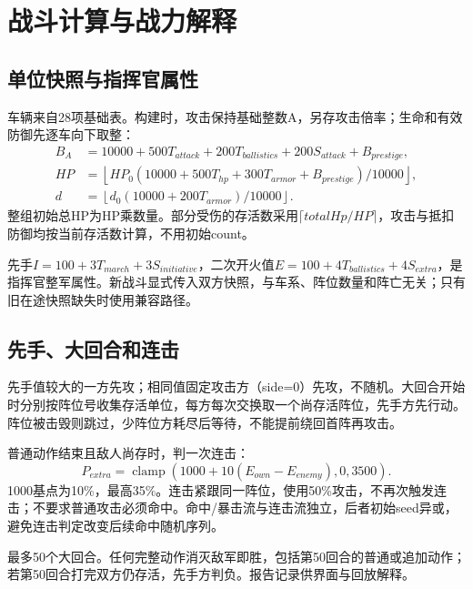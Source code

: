 \chapter{战斗计算与战力解释}
\section{单位快照与指挥官属性}
车辆来自28项基础表。构建时，攻击保持基础整数A，另存攻击倍率；生命和有效防御先逐车向下取整：
\begin{align}
B_A&=10000+500T_{attack}+200T_{ballistics}+200S_{attack}+B_{prestige},\\
HP&=\left\lfloor HP_0(10000+500T_{hp}+300T_{armor}+B_{prestige})/10000\right\rfloor,\\
d&=\left\lfloor d_0(10000+200T_{armor})/10000\right\rfloor.
\end{align}
整组初始总HP为HP乘数量。部分受伤的存活数采用\(\lceil totalHp/HP\rceil\)，攻击与抵扣防御均按当前存活数计算，不用初始count。

先手\(I=100+3T_{march}+3S_{initiative}\)，二次开火值\(E=100+4T_{ballistics}+4S_{extra}\)，是指挥官整军属性。新战斗显式传入双方快照，与车系、阵位数量和阵亡无关；只有旧在途快照缺失时使用兼容路径。

\section{先手、大回合和连击}
先手值较大的一方先攻；相同值固定攻击方（side=0）先攻，不随机。大回合开始时分别按阵位号收集存活单位，每方每次交换取一个尚存活阵位，先手方先行动。阵位被击毁则跳过，少阵位方耗尽后等待，不能提前绕回首阵再攻击。

普通动作结束且敌人尚存时，判一次连击：
\[
P_{extra}=\operatorname{clamp}(1000+10(E_{own}-E_{enemy}),0,3500).
\]
1000基点为10\%，最高35\%。连击紧跟同一阵位，使用50\%攻击，不再次触发连击；不要求普通攻击必须命中。命中/暴击流与连击流独立，后者初始seed异或，避免连击判定改变后续命中随机序列。

最多50个大回合。任何完整动作消灭敌军即胜，包括第50回合的普通或追加动作；若第50回合打完双方仍存活，先手方判负。报告记录供界面与回放解释。

